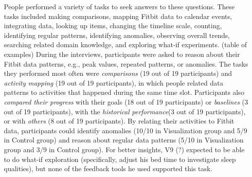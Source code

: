 \documentclass[12pt,oneside]{book}
\begin{document}
People performed a variety of tasks to seek answers to these questions. These tasks included making comparisons, mapping Fitbit data to calendar events, integrating data, looking up items, changing the timeline scale, counting, identifying regular patterns, identifying anomalies, observing overall trends, searching related domain knowledge, and exploring what-if experiments. (table of examples) During the interviews, participants were asked to reason about their Fitbit data patterns, e.g., peak values, repeated patterns, or anomalies. The tasks they performed most often were \textit{comparisons} (19 out of 19 participants) and \textit{activity mapping} (19 out of 19 participants), in which people related data patterns to activities that happened during the same time slot. Participants also \textit{compared their progress} with their goals (18 out of 19 participants) or \textit{baselines} (3 out of 19 participants), with the \textit{historical performance}(3 out of 19 participants), or with \textit{others} (8 out of 19 participants). By relating their activities to Fitbit data, participants could identify anomalies (10/10 in Visualization group and 5/9 in Control group) and reason about regular data patterns (5/10 in Visualization group and 3/9 in Control group). For better insights, V9 (?) expected to be able to do what-if exploration (specifically, adjust his bed time to investigate sleep qualities), but none of the feedback tools he used supported this task.
\end{document}
